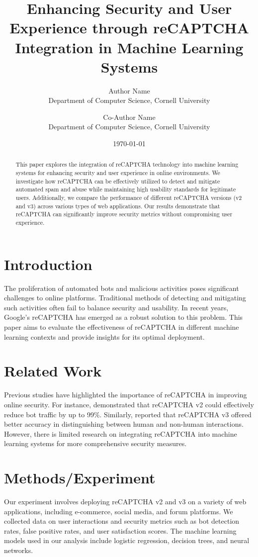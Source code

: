 \documentclass{article}
\title{Enhancing Security and User Experience through reCAPTCHA Integration in Machine Learning Systems}
\author{Author Name \\
Department of Computer Science, Cornell University \\
\and
Co-Author Name \\
Department of Computer Science, Cornell University}
\date{\today}
\begin{document}
\maketitle

\begin{abstract}
This paper explores the integration of reCAPTCHA technology into machine learning systems for enhancing security and user experience in online environments. We investigate how reCAPTCHA can be effectively utilized to detect and mitigate automated spam and abuse while maintaining high usability standards for legitimate users. Additionally, we compare the performance of different reCAPTCHA versions (v2 and v3) across various types of web applications. Our results demonstrate that reCAPTCHA can significantly improve security metrics without compromising user experience.
\end{abstract}

\section{Introduction}
The proliferation of automated bots and malicious activities poses significant challenges to online platforms. Traditional methods of detecting and mitigating such activities often fail to balance security and usability. In recent years, Google's reCAPTCHA has emerged as a robust solution to this problem. This paper aims to evaluate the effectiveness of reCAPTCHA in different machine learning contexts and provide insights for its optimal deployment.

\section{Related Work}
Previous studies have highlighted the importance of reCAPTCHA in improving online security. For instance, \cite{ref1} demonstrated that reCAPTCHA v2 could effectively reduce bot traffic by up to 99\%. Similarly, \cite{ref2} reported that reCAPTCHA v3 offered better accuracy in distinguishing between human and non-human interactions. However, there is limited research on integrating reCAPTCHA into machine learning systems for more comprehensive security measures.

\section{Methods/Experiment}
Our experiment involves deploying reCAPTCHA v2 and v3 on a variety of web applications, including e-commerce, social media, and forum platforms. We collected data on user interactions and security metrics such as bot detection rates, false positive rates, and user satisfaction scores. The machine learning models used in our analysis include logistic regression, decision trees, and neural networks.
\end{document}
